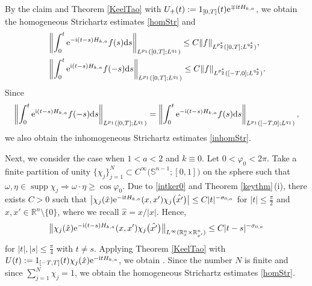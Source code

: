 \documentclass[10pt,a4paper]{amsart}
\numberwithin{equation}{section}
\def\R{\mathbb{R}}%
\DeclareMathOperator{\supp}{supp}%
\def\f{\varphi}
\def\s{\sigma}
\def\y{\eta}
\begin{document}
By the claim and Theorem \ref{KeelTao} with $U_{\pm}(t):=1_{[0,T]}(t){\rm e}^{\mp {\rm i}tH_{k,a}}$, we obtain the homogeneous Strichartz estimates \eqref{homStr} and
\begin{align*}
&\left\|\int_{0}^t{\rm e}^{-{\rm i}(t-s)H_{k,a}}f(s){\rm d}s \right\|_{L^{p_1}([0,T]; L^{q_1})} \leq C\|f\|_{L^{p_2^*}([0,T]; L^{q_2^*})},\\
&\left\|\int_{0}^t{\rm e}^{{\rm i}(t-s)H_{k,a}}f(-s){\rm d}s \right\|_{L^{p_1}([0,T]; L^{q_1})} \leq C\|f\|_{L^{p_2^*}([-T,0]; L^{q_2^*})}.
\end{align*}
Since
\[
\left\|\int_{0}^t{\rm e}^{{\rm i}(t-s)H_{k,a}}f(-s){\rm d}s \right\|_{L^{p_1}([0,T]; L^{q_1})}=\left\|\int_{0}^t{\rm e}^{-{\rm i}(t-s)H_{k,a}}f(s){\rm d}s \right\|_{L^{p_1}([-T,0]; L^{q_1})},
\] we also obtain the inhomogeneous Strichartz estimates \eqref{inhomStr}.






Next, we consider the case when $1<a<2$ and $k\equiv 0$. Let $0<\f_0<2\pi$.
Take a finite partition of unity $\{\chi_j\}_{j=1}^N\subset C^{\infty}\bigl(\mathbb{S}^{n-1};[0,1]\bigr)$ on the sphere such that
$
\omega,\y\in \supp \chi_j\Rightarrow \omega\cdot \y\geq \cos\f_0$.
Due to \eqref{intker0} and Theorem \ref{keythm}\,(i), there exists $C>0$ such that $\big|\chi_j(\hat{x}){\rm e}^{- {\rm i}tH_{k,a}}(x,x')\chi_j\bigl(\hat{x'}\bigr)\big|\leq C|t|^{-\s_{0,a}}$ for $|t|\leq \frac{\pi}{2}$ and $x,x'\in \R^n\setminus \{0\}$, where we recall $\hat{x}=x/|x|$. Hence,
\begin{align*}
\big\|\chi_j(\hat{x}){\rm e}^{- {\rm i}(t-s)H_{k,a}}(x,x')\chi_j\bigl(\hat{x'}\bigr)\big\|_{L^{\infty}(\R^n_x\times \R^n_{x'})}\leq C|t-s|^{-\s_{0,a}}
\end{align*}
for $|t|, |s|\leq \frac{\pi}{4}$ with $t\neq s$.
Applying Theorem \ref{KeelTao} with $U(t):=1_{[-T,T]}(t)\chi_j(\hat{x}){\rm e}^{- {\rm i}tH_{k,a}}$, we obtain
.
Since the number $N$ is finite and since $\sum_{j=1}^N\chi_j=1$, we obtain the homogeneous Strichartz estimates \eqref{homStr}.
\end{document}
